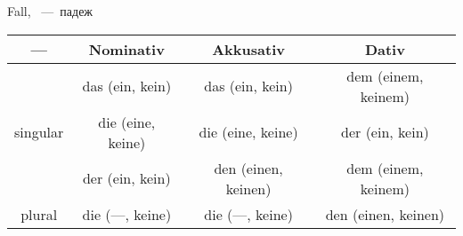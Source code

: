 
 Fall, ~---~падеж

\begin{longtable}{|c|c|c|c|}
\hline
--- & Nominativ & Akkusativ & Dativ \\
\hline
\multirow{3}{*}{singular} & das (ein, kein) & das (ein, kein) & dem (einem, keinem) \\
 & die (eine, keine) & die (eine, keine) & der (ein, kein) \\
 & der (ein, kein) & den (einen, keinen) & dem (einem, keinem) \\
\hline
plural & die (---, keine) & die (---, keine) & den (einen, keinen) \\
\hline
\end{longtable}
